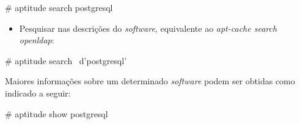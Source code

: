\begin{BoxVerbatim}
    # aptitude search postgresql 
\end{BoxVerbatim}

\begin{itemize}
\item{\bf }Pesquisar nas descrições do {\it software}, equivalente ao {\it apt-cache
search openldap}:
\end{itemize}

\begin{BoxVerbatim}
    # aptitude search ~d'postgresql'
\end{BoxVerbatim}

    Maiores informações sobre um determinado {\it software} podem ser obtidas
como indicado a seguir:

\begin{BoxVerbatim}
    # aptitude show postgresql
\end{BoxVerbatim}

